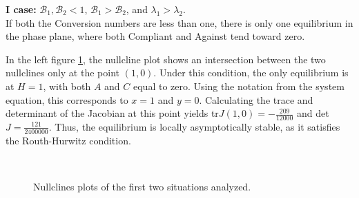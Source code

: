 \textbf{I case: }$\mathcal{B}_1, \mathcal{B}_2 <1$, $\mathcal{B}_1 >  \mathcal{B}_2$, and $\lambda_1 > \lambda_2$. \\
If both the Conversion numbers are less than one, there is only one equilibrium in the phase plane, where both Compliant and Against tend toward zero.

In the left figure \ref{fig:r1r2less1dyn}, the nullcline plot shows an intersection between the two nullclines only at the point $(1,0)$. Under this condition, the only equilibrium is at $H = 1$, with both $A$ and $C$ equal to zero. Using the notation from the system equation, this corresponds to $x = 1$ and $y = 0$. Calculating the trace and determinant of the Jacobian at this point yields tr$J(1,0) = -\frac{209}{12000}$ and det$J = \frac{121}{2400000}$. Thus, the equilibrium is locally asymptotically stable, as it satisfies the Routh-Hurwitz condition.

\begin{figure}[h]
	\centering
	 \quad
	 \\
	\caption[Nullclines first figure]{Nullclines plots of the first two situations analyzed.}
	\label{fig:r1r2less1dyn}
\end{figure}

